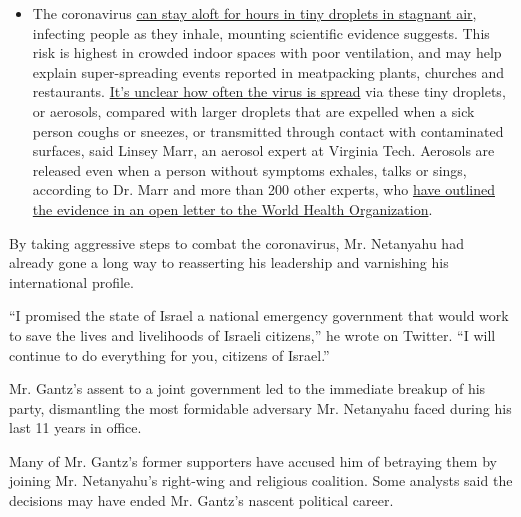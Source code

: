 \begin{itemize}
  \begin{itemize}
  \tightlist
  \item
    The coronavirus
    \href{https://www.nytimes3xbfgragh.onion/2020/07/04/health/239-experts-with-one-big-claim-the-coronavirus-is-airborne.html?action=click\&pgtype=Article\&state=default\&region=MAIN_CONTENT_3\&context=storylines_faq}{can
    stay aloft for hours in tiny droplets in stagnant air}, infecting
    people as they inhale, mounting scientific evidence suggests. This
    risk is highest in crowded indoor spaces with poor ventilation, and
    may help explain super-spreading events reported in meatpacking
    plants, churches and restaurants.
    \href{https://www.nytimes3xbfgragh.onion/2020/07/06/health/coronavirus-airborne-aerosols.html?action=click\&pgtype=Article\&state=default\&region=MAIN_CONTENT_3\&context=storylines_faq}{It's
    unclear how often the virus is spread} via these tiny droplets, or
    aerosols, compared with larger droplets that are expelled when a
    sick person coughs or sneezes, or transmitted through contact with
    contaminated surfaces, said Linsey Marr, an aerosol expert at
    Virginia Tech. Aerosols are released even when a person without
    symptoms exhales, talks or sings, according to Dr. Marr and more
    than 200 other experts, who
    \href{https://academic.oup.com/cid/article/doi/10.1093/cid/ciaa939/5867798}{have
    outlined the evidence in an open letter to the World Health
    Organization}.
  \end{itemize}
\end{itemize}

By taking aggressive steps to combat the coronavirus, Mr. Netanyahu had
already gone a long way to reasserting his leadership and varnishing his
international profile.

``I promised the state of Israel a national emergency government that
would work to save the lives and livelihoods of Israeli citizens,'' he
wrote on Twitter. ``I will continue to do everything for you, citizens
of Israel.''

Mr. Gantz's assent to a joint government led to the immediate breakup of
his party, dismantling the most formidable adversary Mr. Netanyahu faced
during his last 11 years in office.

Many of Mr. Gantz's former supporters have accused him of betraying them
by joining Mr. Netanyahu's right-wing and religious coalition. Some
analysts said the decisions may have ended Mr. Gantz's nascent political
career.

